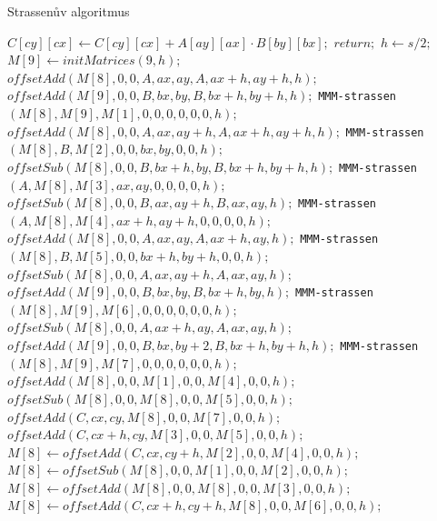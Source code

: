 \documentclass[thesis=B,czech]{FITthesis}[2012/06/26]
\begin{document}
\begin{algorithm}[H]
	\caption{Strassenův algoritmus}\label{mmm-strassen}
	\begin{algorithmic}[1]
			\State \texttt{$C[cy][cx]\gets C[cy][cx] + A[ay][ax] \cdot B[by][bx];$}
			\State \texttt{$return;$}
		\EndIf
  		\State \texttt{$h \gets s/2;$}
  		\State \texttt{$M[9] \gets initMatrices(9, h);$} 
  		\State \texttt{$offsetAdd(M[8],0,0,A,ax,ay,A,ax+h,ay+h,h);$} 
  		\State \texttt{$offsetAdd(M[9],0,0,B,bx,by,B,bx+h,by+h,h);$}
  		\State \texttt{MMM-strassen$(M[8],M[9],M[1],0,0,0,0,0,0,h);$}
  		\State \texttt{$offsetAdd(M[8],0,0,A,ax,ay+h,A,ax+h,ay+h,h);$} 
  		\State \texttt{MMM-strassen$(M[8],B,M[2],0,0,bx,by,0,0,h);$}
  		\State \texttt{$offsetSub(M[8],0,0,B,bx+h,by,B,bx+h,by+h,h);$} 
  		\State \texttt{MMM-strassen$(A,M[8],M[3],ax,ay,0,0,0,0,h);$}
  		\State \texttt{$offsetSub(M[8],0,0,B,ax,ay+h,B,ax,ay,h);$} 
  		\State \texttt{MMM-strassen$(A,M[8],M[4],ax+h,ay+h,0,0,0,0,h);$}
  		\State \texttt{$offsetAdd(M[8],0,0,A,ax,ay,A,ax+h,ay,h);$} 
  		\State \texttt{MMM-strassen$(M[8],B,M[5],0,0,bx+h,by+h,0,0,h);$}
  		\State \texttt{$offsetSub(M[8],0,0,A,ax,ay+h,A,ax,ay,h);$} 
  		\State \texttt{$offsetAdd(M[9],0,0,B,bx,by,B,bx+h,by,h);$}
  		\State \texttt{MMM-strassen$(M[8],M[9],M[6],0,0,0,0,0,0,h);$}
  		\State \texttt{$offsetSub(M[8],0,0,A,ax+h,ay,A,ax,ay,h);$} 
  		\State \texttt{$offsetAdd(M[9],0,0,B,bx,by+2,B,bx+h,by+h,h);$}
  		\State \texttt{MMM-strassen$(M[8],M[9],M[7],0,0,0,0,0,0,h);$}
		\State \texttt{$offsetAdd(M[8],0,0,M[1],0,0,M[4],0,0,h);$} 
		\State \texttt{$offsetSub(M[8],0,0,M[8],0,0,M[5],0,0,h);$}
		\State \texttt{$offsetAdd(C,cx,cy,M[8],0,0,M[7],0,0,h);$}
		\State \texttt{$offsetAdd(C,cx+h,cy,M[3],0,0,M[5],0,0,h);$} 
		\State \texttt{$M[8] \gets offsetAdd(C,cx,cy+h,M[2],0,0,M[4],0,0,h);$} 
		\State \texttt{$M[8] \gets offsetSub(M[8],0,0,M[1],0,0,M[2],0,0,h);$} 
		\State \texttt{$M[8] \gets offsetAdd(M[8],0,0,M[8],0,0,M[3],0,0,h);$}
		\State \texttt{$M[8] \gets offsetAdd(C,cx+h,cy+h,M[8],0,0,M[6],0,0,h);$}
		\EndProcedure
	\end{algorithmic}
\end{algorithm}
\end{document}
